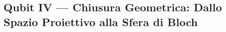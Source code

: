 \documentclass[12pt, a4paper]{article}
\newcommand{\fonti}[1]{%
	\begin{fontebox}
		\textcolor{fontecolor}{\footnotesize\textbf{Fonti:} #1}
	\end{fontebox}%
}
\begin{document}
	
	\subsection{Qubit IV --- Chiusura Geometrica: Dallo Spazio Proiettivo alla Sfera di Bloch}
	
\end{document}
